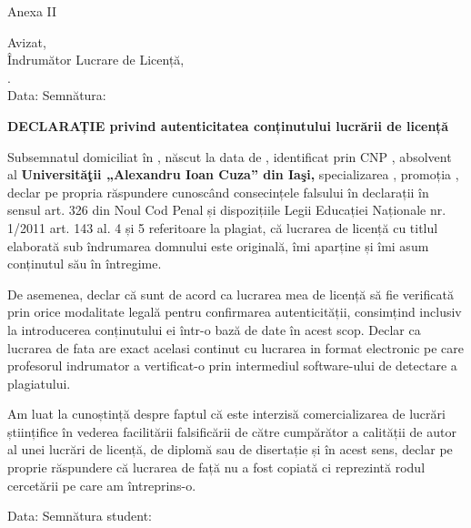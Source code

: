 \begin{flushright}
    Anexa II \\
\end{flushright}
\vspace*{\fill}
\begin{flushright}
    Avizat, \\
    Îndrumător Lucrare de Licență, \\
    \coordinator. \\
    Data: \dottedline \hspace{1cm} Semnătura: \dottedline
\end{flushright}


\vspace{2cm}
\begin{center}
    \large
    \textbf{DECLARAȚIE privind autenticitatea conținutului lucrării de licență}
\end{center}

Subsemnatul \textbf{\authornamelf} domiciliat în \textbf{\authoraddress}, născut la data de \textbf{\authorbirth}, identificat prin CNP \textbf{\authorcnp}, absolvent al \textbf{Universităţii „Alexandru Ioan Cuza” din Iaşi, \faculty} specializarea \textbf{\speciality}, promoția \textbf{\promotion}, declar pe propria răspundere cunoscând consecințele falsului în declarații în sensul art. 326 din Noul Cod Penal și dispozițiile Legii Educației Naționale nr. 1/2011 art. 143 al. 4 și 5 referitoare la plagiat, că lucrarea de licență cu titlul \textbf{\thesistitle} elaborată sub îndrumarea domnului \textbf{\coordinator} este originală, îmi aparține și îmi asum conținutul său în întregime.

De asemenea, declar că sunt de acord ca lucrarea mea de licență să fie verificată prin orice modalitate legală pentru confirmarea autenticității, consimțind inclusiv la introducerea conținutului ei într-o bază de date în acest scop. Declar ca lucrarea de fata are exact acelasi continut cu lucrarea in format electronic pe care profesorul indrumator a vertificat-o prin intermediul software-ului de detectare a plagiatului.

Am luat la cunoștință despre faptul că este interzisă comercializarea de lucrări științifice în vederea facilitării falsificării de către cumpărător a calității de autor al unei lucrări de licență, de diplomă sau de disertație și în acest sens, declar pe proprie răspundere că lucrarea de față nu a fost copiată ci reprezintă rodul cercetării pe care am întreprins-o.

\begin{flushright}
    Data: \dottedline \hspace{2cm} Semnătura student: \dottedline
\end{flushright}

\vspace*{\fill}
\pagebreak